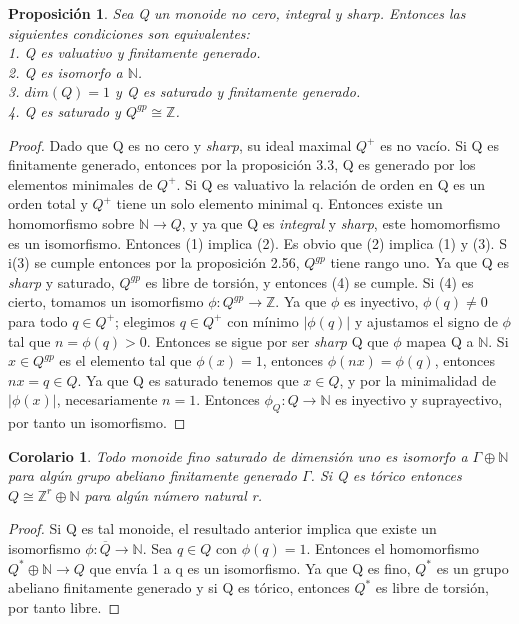 \documentclass[12pt,spanish]{amsart}
\newcommand{\bb}[1]{\mathbb{#1}}
\newtheorem{prop}[Theorem]{Proposición}
\newtheorem{cor}[Theorem]{Corolario}
\theoremstyle{definition}
\theoremstyle{remark}
\begin{document}
\begin{prop}
Sea Q un monoide no cero, \textit{integral} y \textit{sharp}. Entonces las siguientes condiciones son equivalentes: \\
1. Q es valuativo y finitamente generado. \\ 
2. Q es isomorfo a $\bb{N}$. \\ 
3. $dim(Q)=1$ y Q es saturado y finitamente generado. \\ 
4. Q es saturado y $Q^{gp}\cong \bb{Z}$. 
\end{prop}

\begin{proof}
Dado que Q es no cero y \textit{sharp}, su ideal maximal $Q^{+}$ es no vacío. Si Q es finitamente generado, entonces por la proposición 3.3, Q es generado por los elementos minimales de $Q^{+}$. Si Q es valuativo la relación de orden en Q es un orden total y $Q^{+}$ tiene un solo elemento minimal q. Entonces existe un homomorfismo sobre $\bb{N} \to Q$, y ya que Q es \textit{integral} y \textit{sharp}, este homomorfismo es un isomorfismo. Entonces (1) implica (2). Es obvio que (2) implica (1) y  (3). S i(3) se cumple entonces por la proposición 2.56, $Q^{gp}$ tiene rango uno. Ya que Q es \textit{sharp} y saturado, $Q^{gp}$ es libre de torsión, y entonces (4) se cumple. Si (4) es cierto, tomamos un isomorfismo  $\phi:Q^{gp} \to \bb{Z}$. Ya que $\phi$ es inyectivo, $\phi(q)\neq 0$ para todo $q\in Q^{+}$; elegimos $q\in Q^{+}$ con mínimo $|\phi(q)|$ y ajustamos el signo de $\phi$ tal que $n=\phi(q)>0$. Entonces se sigue por ser \textit{sharp} Q que $\phi$ mapea Q a $\bb{N}$. Si $x\in Q^{gp}$ es el elemento tal que $\phi(x)=1$, entonces $\phi(nx)=\phi(q)$, entonces $nx=q\in Q$. Ya que Q es saturado tenemos que $x\in Q$, y por la minimalidad de $|\phi(x)|$, necesariamente $n=1$. Entonces $\phi_{Q}:Q \to \bb{N}$ es inyectivo y suprayectivo, por tanto un isomorfismo.   
\end{proof}


\begin{cor}
Todo monoide fino saturado de dimensión uno es isomorfo a $\Gamma \oplus \bb{N}$ para algún grupo abeliano finitamente generado $\Gamma$. Si Q es tórico entonces $Q\cong \bb{Z}^{r}\oplus \bb{N}$ para algún número natural r.  
\end{cor}

\begin{proof}
Si Q es tal monoide, el resultado anterior implica que existe un isomorfismo $\phi:\overline{Q}\to \bb{N}$. Sea $q\in Q$ con $\phi(q)=1$. Entonces el homomorfismo $Q^{\ast}\oplus \bb{N} \to Q$ que envía 1 a q es un isomorfismo. Ya que Q es fino, $Q^{\ast}$ es un grupo abeliano finitamente generado y si Q es tórico, entonces $Q^{\ast}$ es libre de torsión, por tanto libre.  
\end{proof}
\end{document}
